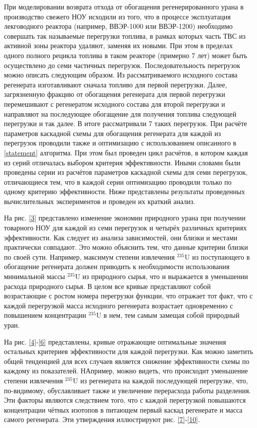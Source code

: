 При моделировании возврата отхода от обогащения регенерированного урана в производство свежего НОУ исходили из того, что в процессе эксплуатация лекговодного реактора (например, ВВЭР-1000 или ВВЭР-1200) необходимо совершать так называемые перегрузки топлива, в рамках которых часть ТВС из активной зоны реактора удаляют, заменяя их новыми. При этом в пределах одного полного рецикла топлива в таком реакторе (примерно 7 лет) может быть осуществлено до семи частичных перегрузок. Последовательность перегрузок можно описать следующим образом. Из рассматриваемого исходного состава регенерата изготавливают сначала топливо для первой перегрузки. Далее, загрязненную фракцию от обогащения регенерата для первой перегрузки перемешивают с регенератом исходного состава для второй перегрузки и направляют на последующее обогащение для получения топлива следующей перегрузки и так далее. В итоге рассматривали 7 таких перегрузок. При расчёте параметров каскадной схемы для обогащения регенерата для каждой из перегрузок проводили также и оптимизацию с использованием описанного в \ref{statement} алгоритма. При этом был проведен цикл расчётов, в котором каждая из серий отличалась выбором критерия эффективности. Иными словами были проведены серии из расчётов параметров каскадной схемы для семи перегрузок, отличающиеся тем, что в каждой серии оптимизацию проводили только по одному критерию эффективности. Ниже представлены результаты проведенных вычислительных экспериментов и проведен их краткий анализ.

На рис. \ref{3} представлено изменение экономии природного урана при получении товарного НОУ для каждой из семи перегрузок и четырёх различных критериях эффективности. Как следует из анализа зависимостей, они близки и местами практически совпадают. Это можно объяснить тем, что данные критерии близки по своей сути. Например, максимум степени извлечения $^{235}$U из поступающего в обогащение регенерата должен приводить к необходимости использования минимальной массы $^{235}$U из природного сырья, что и выражается в уменьшении расхода природного сырья. В целом все кривые представляют собой возрастающие с ростом номера перегрузки функции, что отражает тот факт, что с каждой перегрузкой масса исходного регенерата возрастает одновременно с повышением концентрации $^{235}$U в нем, тем самым замещая собой природный уран.

На рис. \ref{4}-\ref{6} представлены, кривые отражающие оптимальные значения остальных критериев эффективности для каждой перегрузки. Как можно заметить общей тенденцией для всех случаев является снижение эффективности схемы по каждому из показателей. НАпример, можно видеть, что происходит уменьшение степени извлечения $^{235}$U из регенерата на каждой последующей перегрузке, что, по-видимому, обуславливает также и увеличение перерасхода работы разделения. Эти факторы являются следствием того, что с каждой перегрузкой повышаются концентрации чётных изотопов в питающем первый каскад регенерате и масса самого регенерата. Эти утверждения иллюстрируют рис. \ref{7}-\ref{10}.   


